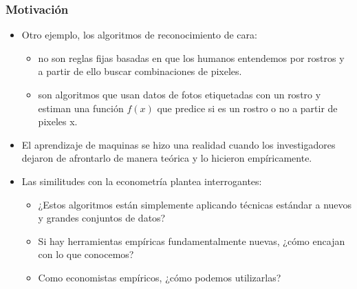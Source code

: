 \documentclass[
  shownotes,
  xcolor={svgnames},
  hyperref={colorlinks,citecolor=DarkBlue,linkcolor=DarkRed,urlcolor=DarkBlue}
  , aspectratio=169]{beamer}
\begin{document}
\begin{frame}
\frametitle{Motivación}

\begin{itemize}
      \item Otro ejemplo, los algoritmos de reconocimiento de cara: 
      \medskip
      \begin{itemize}
        \item no son reglas fijas basadas en que los humanos entendemos por rostros y a partir de ello buscar combinaciones de pixeles.
        \item son algoritmos que usan datos de fotos etiquetadas con un rostro y estiman una función $f(x)$ que predice si es un rostro o no a partir de pixeles x.
      \end{itemize}
      \medskip
      \item El aprendizaje de maquinas se hizo una realidad cuando los investigadores dejaron de afrontarlo de manera teórica y lo hicieron empíricamente.
      \medskip
      \item  Las similitudes con la econometría plantea interrogantes:
      \begin{itemize}
      \item  ¿Estos algoritmos están simplemente aplicando técnicas estándar a nuevos y grandes conjuntos de datos? 
      \item  Si hay herramientas empíricas fundamentalmente nuevas, ¿cómo encajan con lo que conocemos? 
      \item  Como economistas empíricos, ¿cómo podemos utilizarlas?
       \end{itemize}
\end{itemize}

\end{frame}



\end{document}
